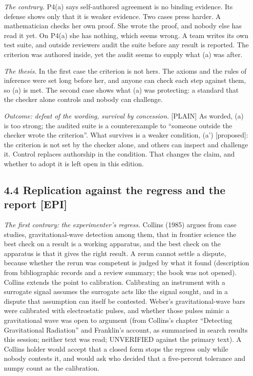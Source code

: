 \documentclass[11pt]{article}
\newcommand{\register}[1]{{\ttfamily\small #1}}
\begin{document}
\emph{The contrary.} P4(a) says self-authored agreement is no binding evidence. Its defense shows only that it is weaker evidence. Two cases press harder. A mathematician checks her own proof. She wrote the proof, and nobody else has read it yet. On P4(a) she has nothing, which seems wrong. A team writes its own test suite, and outside reviewers audit the suite before any result is reported. The criterion was authored inside, yet the audit seems to supply what (a) was after.

\emph{The thesis.} In the first case the criterion is not hers. The axioms and the rules of inference were set long before her, and anyone can check each step against them, so (a) is met. The second case shows what (a) was protecting: a standard that the checker alone controls and nobody can challenge.

\emph{Outcome: defeat of the wording, survival by concession.} \register{[PLAIN]} As worded, (a) is too strong; the audited suite is a counterexample to ``someone outside the checker wrote the criterion''. What survives is a weaker condition, (a') [proposed]: the criterion is not set by the checker alone, and others can inspect and challenge it. Control replaces authorship in the condition. That changes the claim, and whether to adopt it is left open in this edition.

\subsection*{4.4 Replication against the regress and the report [EPI]}

\emph{The first contrary: the experimenter's regress.} Collins (1985) argues from case studies, gravitational-wave detection among them, that in frontier science the best check on a result is a working apparatus, and the best check on the apparatus is that it gives the right result. A rerun cannot settle a dispute, because whether the rerun was competent is judged by what it found (description from bibliographic records and a review summary; the book was not opened). Collins extends the point to calibration. Calibrating an instrument with a surrogate signal assumes the surrogate acts like the signal sought, and in a dispute that assumption can itself be contested. Weber's gravitational-wave bars were calibrated with electrostatic pulses, and whether those pulses mimic a gravitational wave was open to argument (from Collins's chapter ``Detecting Gravitational Radiation'' and Franklin's account, as summarised in search results this session; neither text was read; UNVERIFIED against the primary text). A Collins holder would accept that a closed form stops the regress only while nobody contests it, and would ask who decided that a five-percent tolerance and numpy count as the calibration.
\end{document}
